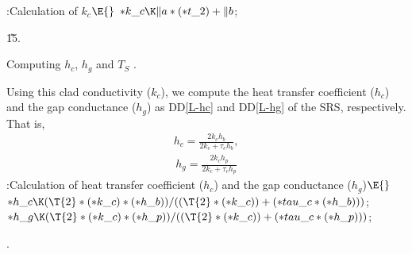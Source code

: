 \documentclass[letterpaper,12pt,baseclass=report]{cweb-hy}
\begin{document}
{
\Y\B\4:Calculation of $k_c$\X${}\E{}$\6
${*}\\{k\_c}\K\|a*({*}\\{t\_2})+\|b{}$;\par
\U15.\fi


\fi

Computing ${h_c}$, ${h_g}$ and ${T_S}$ .\label{hcgts}

\noindent Using this clad conductivity ($k_c$), we compute the heat transfer
coefficient
($h_c$) and the gap conductance ($h_g$) as DD\ref{L-hc} and DD\ref{L-hg} of the
SRS,
respectively. That is,
\begin{align}
h_{c} =\frac{ 2k_{c}h_{b}}{2k_{c}+\tau_ch_{b}}, \label{eq:hc}
\end{align}
\begin{align}
h_{g} =\frac{2k_{c}h_{p}}{2k_{c}+\tau_c h_{p}} \label{eq:hg}
\end{align}
\Y\B\4:Calculation of heat transfer coefficient ($h_{c}$) and the gap
conductance ($h_{g}$)\X${}\E{}$%
\6
${*}\\{h\_c}\K(\T{2}*({*}\\{k\_c})*({*}\\{h\_b}))/((\T{2}*({*}\\{k\_c}))+({*}%
\\{tau\_c}*({*}\\{h\_b}))){}$;\6
${}{*}\\{h\_g}\K(\T{2}*({*}\\{k\_c})*({*}\\{h\_p}))/((\T{2}*({*}\\{k\_c}))+({*}%
\\{tau\_c}*({*}\\{h\_p}))){}$;\par
{}.\fi

}
\end{document}
